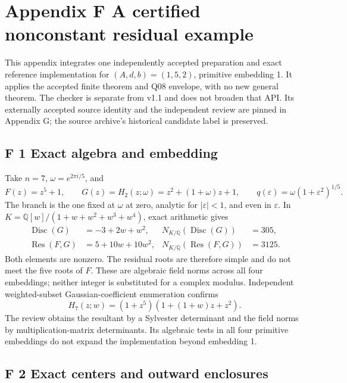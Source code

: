 \documentclass[
  11pt,
]{article}
\begin{document}
\clearpage
\section{Appendix F A certified nonconstant residual example}
\label{appendix-f-residual}

This appendix integrates one independently accepted preparation and exact
reference implementation for \((A,d,b)=(1,5,2)\), primitive embedding 1.
It applies the accepted finite theorem and Q08 envelope, with no new general
theorem. The checker is separate from v1.1 and does not broaden that API.
Its externally accepted source identity and the independent review are
pinned in Appendix G; the source archive's historical candidate label is
preserved.

\subsection{F 1 Exact algebra and embedding}

Take \(n=7\), \(\omega=e^{2\pi i/5}\), and
\[
F(z)=z^5+1,\qquad G(z)=H_2(z;\omega)=z^2+(1+\omega)z+1,
\qquad q(\varepsilon)=\omega(1+\varepsilon^2)^{1/5}.
\tag{F1}
\]
The branch is the one fixed at \(\omega\) at zero, analytic for
\(|\varepsilon|<1\), and even in \(\varepsilon\). In
\(K=\mathbb Q[w]/(1+w+w^2+w^3+w^4)\), exact arithmetic gives
\begin{align*}
\operatorname{Disc}(G)&=-3+2w+w^2,&
N_{K/\mathbb Q}(\operatorname{Disc}(G))&=305,\\
\operatorname{Res}(F,G)&=5+10w+10w^2,&
N_{K/\mathbb Q}(\operatorname{Res}(F,G))&=3125.
\end{align*}
Both elements are nonzero. The residual roots are therefore simple and do
not meet the five roots of \(F\). These are algebraic field norms across
all four embeddings; neither integer is substituted for a complex modulus.
Independent weighted-subset Gaussian-coefficient enumeration confirms
\[
H_7(z;w)=(1+z^5)(1+(1+w)z+z^2). \tag{F2}
\]
The review obtains the resultant by a Sylvester determinant and the field
norms by multiplication-matrix determinants. Its algebraic tests in all
four primitive embeddings do not expand the implementation beyond embedding 1.

\subsection{F 2 Exact centers and outward enclosures}
\end{document}
